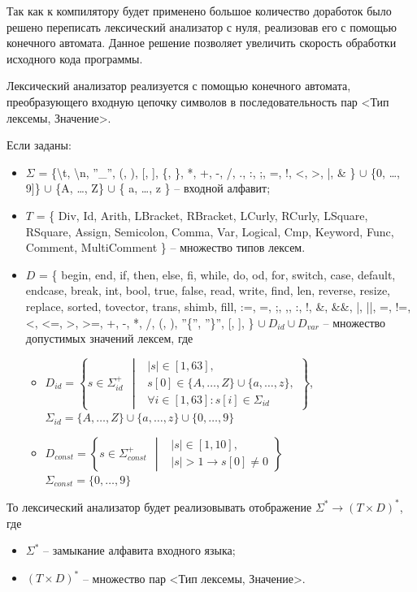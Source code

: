 \documentclass[a4paper,final]{article}
\begin{document}
Так как к компилятору будет применено большое количество доработок было решено переписать лексический анализатор с нуля, реализовав его с помощью конечного автомата. Данное решение позволяет увеличить скорость обработки исходного кода программы.

Лексический анализатор реализуется с помощью конечного автомата, преобразующего входную цепочку символов в последовательность пар <Тип лексемы, Значение>.

Если заданы:
\begin{itemize}
    \item $\displaystyle \Sigma$ = \{\textbackslash t, \textbackslash n, ''\_'', (, ), [, ], \{, \}, *, +, -, /, ., :, ;, =, !, <, >, |, \& \} $\cup$ \{0, \dots, 9]\} $\cup$ \{A, \dots, Z\} $\cup$ \{ a, \dots, z \} -- входной алфавит;
    \item $\displaystyle T$ = \{ Div,
Id, Arith, LBracket, RBracket, LCurly, RCurly, LSquare, RSquare, Assign, Semicolon, Comma, Var, Logical, Cmp, Keyword, Func, Comment, MultiComment \} -- множество типов лексем.
    \item $D$ = \{ begin, end, if, then, else, fi, while, do, od, for, switch, case, default, endcase, break, int, bool, true, false, read, write, find, len, reverse, resize, replace, sorted, tovector, trans, shimb, fill, :=, =, ;, ,, :, !, \&, \&\&, |, ||, =, !=, <, <=, >, >=, +, -, *, /, (, ), ''\{'', ''\}'', [, ], \} $\cup ~D_{id} \cup D_{var}$ -- множество допустимых значений лексем, где
    \begin{itemize}
        \item $D_{id} = \left\{s \in \Sigma_{id}^+~~ \middle|~~\begin{array}{l}
            |s| \in [1, 63], \\
            s[0] \in \{A, \dots, Z\} \cup \{ a, \dots, z \}, \\
            \forall i \in [1, 63]: s[i] \in \Sigma_{id}
        \end{array}
        \right\}$,\\[1em]
        $\Sigma_{id} = \{A, \dots, Z\} \cup \{ a, \dots, z \} \cup \{ 0, \dots, 9 \}$
        \item $D_{const} = \left\{s \in \Sigma_{const}^+~~ \middle|~~\begin{array}{l}
            |s| \in [1, 10],\\
            |s| > 1 \rightarrow s[0] \neq 0
        \end{array}
        \right\}$\\[1em]
        $\Sigma_{const} = \{ 0, \dots, 9 \}$
    \end{itemize}
\end{itemize}
То лексический анализатор будет реализовывать отображение $\displaystyle \Sigma^* \longrightarrow (T \times D)^*$, где
\begin{itemize}
    \item $\displaystyle \Sigma^*$ -- замыкание алфавита входного языка;
    \item $(T \times D)^*$ -- множество пар <Тип лексемы, Значение>.
\end{itemize}
\end{document}
